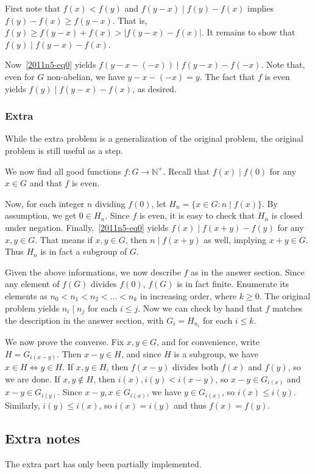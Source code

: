 \documentclass{article}
\newcommand{\N}{\mathbb{N}}
\begin{document}
First note that $f(x) < f(y)$ and $f(y - x) \mid f(y) - f(x)$ implies $f(y) - f(x) \geq f(y - x)$.
That is, $f(y) \geq f(y - x) + f(x) > |f(y - x) - f(x)|$.
It remains to show that $f(y) \mid f(y - x) - f(x)$.

Now~\eqref{2011n5-eq0} yields $f(y - x - (-x)) \mid f(y - x) - f(-x)$.
Note that, even for $G$ non-abelian, we have $y - x - (-x) = y$.
The fact that $f$ is even yields $f(y) \mid f(y - x) - f(x)$, as desired.


\subsubsection*{Extra}

While the extra problem is a generalization of the original problem, the original problem is still useful as a step.

We now find all good functions $f : G \to \N^+$.
Recall that $f(x) \mid f(0)$ for any $x \in G$ and that $f$ is even.

Now, for each integer $n$ dividing $f(0)$, let $H_n = \{x \in G : n \mid f(x)\}$.
By assumption, we get $0 \in H_n$.
Since $f$ is even, it is easy to check that $H_n$ is closed under negation.
Finally,~\eqref{2011n5-eq0} yields $f(x) \mid f(x + y) - f(y)$ for any $x, y \in G$.
That means if $x, y \in G$, then $n \mid f(x + y)$ as well, implying $x + y \in G$.
Thus $H_n$ is in fact a subgroup of $G$.

Given the above informations, we now describe $f$ as in the answer section.
Since any element of $f(G)$ divides $f(0)$, $f(G)$ is in fact finite.
Enumerate its elements as $n_0 < n_1 < n_2 < \ldots < n_k$ in increasing order, where $k \geq 0$.
The original problem yields $n_i \mid n_j$ for each $i \leq j$.
Now we can check by hand that $f$ matches the description in the answer section, with $G_i = H_{n_i}$ for each $i \leq k$.

We now prove the converse.
Fix $x, y \in G$, and for convenience, write $H = G_{i(x - y)}$.
Then $x - y \in H$, and since $H$ is a subgroup, we have $x \in H \iff y \in H$.
If $x, y \in H$, then $f(x - y)$ divides both $f(x)$ and $f(y)$, so we are done.
If $x, y \notin H$, then $i(x), i(y) < i(x - y)$, so $x - y \in G_{i(x)}$ and $x - y \in G_{i(y)}$.
Since $x - y, x \in G_{i(x)}$, we have $y \in G_{i(x)}$, so $i(x) \leq i(y)$.
Similarly, $i(y) \leq i(x)$, so $i(x) = i(y)$ and thus $f(x) = f(y)$.



\subsection*{Extra notes}

The extra part has only been partially implemented.
\end{document}
